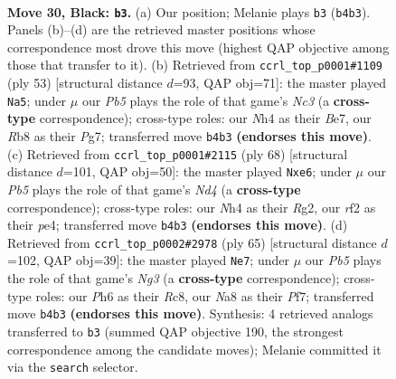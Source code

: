 \documentclass[11pt]{article}
\begin{document}
\clearpage

\begin{figure}[p]\centering
\begin{subfigure}{0.46\textwidth}\centering
\resizebox{\linewidth}{!}{%
\newchessgame
\chessboard[
  setfen={nr1r2k1/5pb1/p5qp/2Q1p3/1p2P2n/3P1P2/PP1B1RN1/RN4K1 b - - 0 30},
  showmover=false,
  pgfstyle=straightmove, color=movearrow, markmove={b4-b3}
]}
\caption{}
\end{subfigure}\hfill
\begin{subfigure}{0.46\textwidth}\centering
\resizebox{\linewidth}{!}{%
\newchessgame
\chessboard[
  setfen={5rk1/pb2bpp1/2n1p2p/1pq3NQ/4BP2/2P4P/P5P1/R3R2K b - - 1 27},
  showmover=false,
  pgfstyle=straightmove, color=movearrow, markmove={c6-a5}
]}
\caption{}
\end{subfigure}
\\[4pt]
\begin{subfigure}{0.46\textwidth}\centering
\resizebox{\linewidth}{!}{%
\newchessgame
\chessboard[
  setfen={4rr1k/1P2b1pp/p2pp3/6PP/3NpP2/P1q1n1Q1/2P3R1/1R4K1 w - - 1 35},
  showmover=false,
  pgfstyle=straightmove, color=movearrow, markmove={d4-e6}
]}
\caption{}
\end{subfigure}\hfill
\begin{subfigure}{0.46\textwidth}\centering
\resizebox{\linewidth}{!}{%
\newchessgame
\chessboard[
  setfen={2r1r1k1/p4pp1/1p1pq1n1/2bN2Q1/4P2p/2P4P/P4PPB/3RR1K1 b - - 7 33},
  showmover=false,
  pgfstyle=straightmove, color=movearrow, markmove={g6-e7}
]}
\caption{}
\end{subfigure}
\caption{\textbf{Move 30, Black: \texttt{b3}.} (a) Our position; Melanie plays \texttt{b3} (\texttt{b4b3}). Panels (b)--(d) are the retrieved master positions whose correspondence most drove this move (highest QAP objective among those that transfer to it). (b) Retrieved from \texttt{ccrl\_top\_p0001\#1109} (ply 53) [structural distance $d$=93, QAP obj=71]: the master played \texttt{Na5}; under $\mu$ our \emph{Pb5} plays the role of that game's \emph{Nc3} (a \textbf{cross-type} correspondence); cross-type roles: our \emph{N}h4 as their \emph{B}e7, our \emph{R}b8 as their \emph{P}g7; transferred move \texttt{b4b3} \textbf{(endorses this move)}. (c) Retrieved from \texttt{ccrl\_top\_p0001\#2115} (ply 68) [structural distance $d$=101, QAP obj=50]: the master played \texttt{Nxe6}; under $\mu$ our \emph{Pb5} plays the role of that game's \emph{Nd4} (a \textbf{cross-type} correspondence); cross-type roles: our \emph{N}h4 as their \emph{R}g2, our \emph{r}f2 as their \emph{p}e4; transferred move \texttt{b4b3} \textbf{(endorses this move)}. (d) Retrieved from \texttt{ccrl\_top\_p0002\#2978} (ply 65) [structural distance $d$=102, QAP obj=39]: the master played \texttt{Ne7}; under $\mu$ our \emph{Pb5} plays the role of that game's \emph{Ng3} (a \textbf{cross-type} correspondence); cross-type roles: our \emph{P}h6 as their \emph{R}c8, our \emph{N}a8 as their \emph{P}f7; transferred move \texttt{b4b3} \textbf{(endorses this move)}. Synthesis: 4 retrieved analogs transferred to \texttt{b3} (summed QAP objective 190, the strongest correspondence among the candidate moves); Melanie committed it via the \texttt{search} selector.}
\label{fig:thought-m59}
\end{figure}
\end{document}
